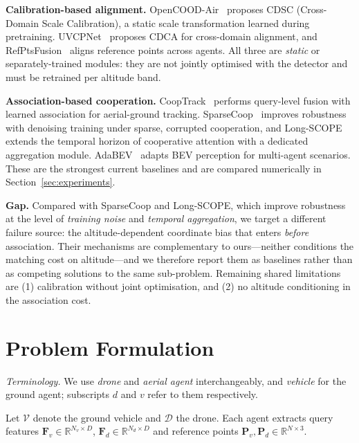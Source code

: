 \documentclass[9.5pt,twocolumn,a4paper]{IEEEtran}
\def\mb#1{\mathbf{#1}}
\begin{document}
\noindent\textbf{Calibration-based alignment.} OpenCOOD-Air~\cite{opencood_air} proposes CDSC (Cross-Domain Scale Calibration), a static scale transformation learned during pretraining. UVCPNet~\cite{uvcpnet} proposes CDCA for cross-domain alignment, and RefPtsFusion~\cite{refptsfusion} aligns reference points across agents. All three are \emph{static} or separately-trained modules: they are not jointly optimised with the detector and must be retrained per altitude band.

\noindent\textbf{Association-based cooperation.} CoopTrack~\cite{cooptrack} performs query-level fusion with learned association for aerial-ground tracking. SparseCoop~\cite{sparsecoop} improves robustness with denoising training under sparse, corrupted cooperation, and Long-SCOPE~\cite{longscope} extends the temporal horizon of cooperative attention with a dedicated aggregation module. AdaBEV~\cite{adabev} adapts BEV perception for multi-agent scenarios. These are the strongest current baselines and are compared numerically in Section~\ref{sec:experiments}.

\noindent\textbf{Gap.} Compared with SparseCoop and Long-SCOPE, which improve robustness at the level of \emph{training noise} and \emph{temporal aggregation}, we target a different failure source: the altitude-dependent coordinate bias that enters \emph{before} association. Their mechanisms are complementary to ours---neither conditions the matching cost on altitude---and we therefore report them as baselines rather than as competing solutions to the same sub-problem. Remaining shared limitations are (1) calibration without joint optimisation, and (2) no altitude conditioning in the association cost.

\section{Problem Formulation}
\label{sec:problem}

\noindent\emph{Terminology.} We use \emph{drone} and \emph{aerial agent} interchangeably, and \emph{vehicle} for the ground agent; subscripts $d$ and $v$ refer to them respectively.

Let $\mathcal{V}$ denote the ground vehicle and $\mathcal{D}$ the drone. Each agent extracts query features $\mb{F}_v \in \mathbb{R}^{N_v \times D}$, $\mb{F}_d \in \mathbb{R}^{N_d \times D}$ and reference points $\mb{P}_v, \mb{P}_d \in \mathbb{R}^{N \times 3}$.
\end{document}
